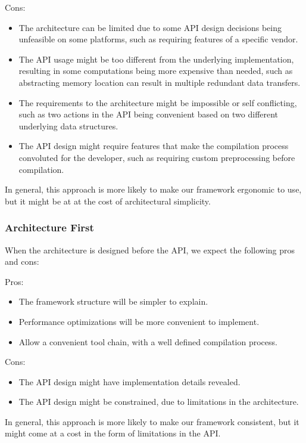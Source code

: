 Cons:
\begin{itemize}
\item The architecture can be limited due to some API design decisions being unfeasible on some platforms, such as requiring features of a specific vendor.
\item The API usage might be too different from the underlying implementation, resulting in some computations being more expensive than needed, such as abstracting memory location can result in multiple redundant data transfers.
\item The requirements to the architecture might be impossible or self conflicting, such as two actions in the API being convenient based on two different underlying data structures.
\item The API design might require features that make the compilation process convoluted for the developer, such as requiring custom preprocessing before compilation.
\end{itemize}

In general, this approach is more likely to make our framework ergonomic to use, but it might be at at the cost of architectural simplicity. 

\subsubsection{Architecture First}
When the architecture is designed before the API, we expect the following pros and cons:

Pros:
\begin{itemize}
\item The framework structure will be simpler to explain.
\item Performance optimizations will be more convenient to implement.
\item Allow a convenient tool chain, with a well defined compilation process.
\end{itemize}

Cons:
\begin{itemize}
\item The API design might have implementation details revealed.
\item The API design might be constrained, due to limitations in the architecture.
\end{itemize}

In general, this approach is more likely to make our framework consistent, but it might come at a cost in the form of limitations in the API. 

